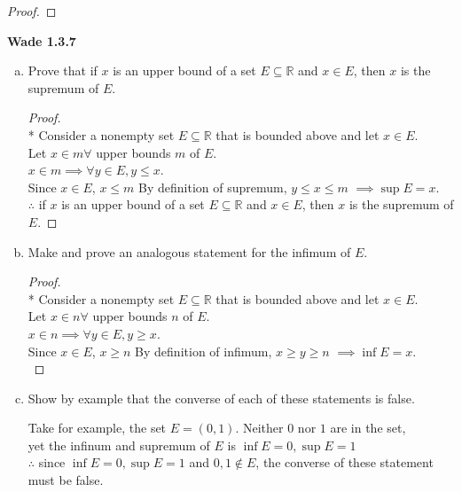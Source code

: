 \documentclass[a4paper]{article}
\newcommand{\real}{\mathbb{R}}
\begin{document}
\begin{flushleft}
\begin{proof}
            \end{proof}

        \textbf{Wade 1.3.7} \\
        \begin{enumerate}[a.]
            \item Prove that if $x$ is an upper bound of a set $E \subseteq \real$ and $x\in E$, then $x$ is  the supremum of $E$.
                \begin{proof}\mbox{}\\*
                    Consider a nonempty set $E\subseteq \real$ that is bounded above and let $x\in E$. \\
                    Let $x \in m \forall$ upper bounds $m$ of $E$. \\
                    $x \in m \implies \forall y\in E, y \leq x$. \\
                    Since $x \in E$, $x \leq m$
                    By definition of supremum, $y \leq x \leq m $ $\implies \sup E = x$. \\
                    $\therefore$ if $x$ is an upper bound of a set $E \subseteq \real$ and $x\in E$, then $x$ is  the supremum of $E$.
                \end{proof}
            \item Make and prove an analogous statement for the infimum of $E$.
                

                \begin{proof}\mbox{}\\*
                    Consider a nonempty set $E\subseteq \real$ that is bounded above and let $x\in E$. \\
                    Let $x \in n \forall$ upper bounds $n$ of $E$. \\
                    $x \in n \implies \forall y\in E, y \geq x$. \\
                    Since $x \in E$, $x \geq n$
                    By definition of infimum, $x \geq y \geq n $ $\implies \inf E = x$. \\
                \end{proof}

            \item Show by example that the converse of each of these statements is false. 
            
            Take for example, the set $E = (0, 1)$. Neither $0$ nor $1$ are in the set, \\
            yet the infinum and supremum of $E$ is $\inf E = 0, \sup E = 1$ \\
            $\therefore$ since $\inf E = 0, \sup E = 1$ and $0,1 \notin E$, the converse of these statement must be false.

        \end{enumerate}
        
    \end{flushleft}
\end{document}
